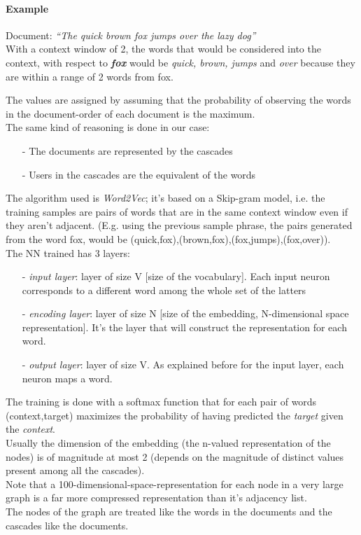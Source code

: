 \documentclass{article}
\newcommand\tab[1][1cm]{\hspace*{#1}}
\begin{document}
			\paragraph{Example}
			\begin{addmargin}[1em]{0em}
	            \medskip
				\tab Document: \textit{\textquotedblleft The quick brown fox jumps over the lazy dog\textquotedblright}\smallskip \\
				With a context window of 2, the words that would be considered into the context, with respect to \textit{\textbf{fox}} would be \textit{quick, brown, jumps} and \textit{over} because they are within a range of 2 words from fox.
			\end{addmargin}
			The values are assigned by assuming that the probability of observing the words in the document-order of each document is the maximum.\\
			The same kind of reasoning is done in our case:
			\begin{itemize}
				\item [-] The documents are represented by the cascades
				\item [-] Users in the cascades are the equivalent of the words
			\end{itemize}
			The algorithm used is \textit{Word2Vec}; it's based on a Skip-gram model, i.e. the training samples are pairs of words that are in the same context window even if they aren't adjacent. (E.g. using the previous sample phrase, the pairs generated from the word fox, would be (quick,fox),(brown,fox),(fox,jumps),(fox,over)).\\
			The NN trained has 3 layers:
			\begin{itemize}
				\item [-] \textit{input layer}: layer of size V [size of the vocabulary]. Each input neuron corresponds to a different word among the whole set of the latters
				\item [-] \textit{encoding layer}: layer of size N [size of the embedding, N-dimensional space representation]. It's the layer that will construct the representation for each word.
				\item [-] \textit{output layer}: layer of size V. As explained before for the input layer, each neuron maps a word.
			\end{itemize}
			The training is done with a softmax function that for each pair of words (context,target) maximizes the probability of having predicted the \textit{target} given the \textit{context}.\medskip\\
			Usually the dimension of the embedding (the n-valued representation of the nodes) is of magnitude at most 2 (depends on the magnitude of distinct values present among all the cascades).\\
			Note that a 100-dimensional-space-representation for each node in a very large graph is a far more compressed representation than it's adjacency list.\medskip\\
			The nodes of the graph are treated like the words in the documents and the cascades like the documents.
\end{document}
